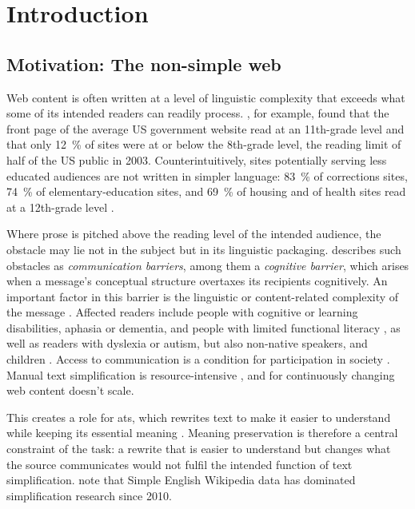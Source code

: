 \chapter{Introduction}
\label{sec:introduction}

\section{Motivation: The non-simple web}
\label{sec:motivation}

Web content is often written at a level of linguistic complexity that exceeds what some of its intended readers can readily process.
\textcite[4--5]{west2003state}, for example, found that the front page of the average US government website read at an 11th-grade level and that only \qty{12}{\percent} of sites were at or below the 8th-grade level, the reading limit of half of the US public in 2003.
Counterintuitively, sites potentially serving less educated audiences are not written in simpler language: \qty{83}{\percent} of corrections sites, \qty{74}{\percent} of elementary-education sites, and \qty{69}{\percent} of housing and of health sites read at a 12th-grade level \parencite[5]{west2003state}.

Where prose is pitched above the reading level of the intended audience, the obstacle may lie not in the subject but in its linguistic packaging.
\textcite[29, 31]{rink2018kommunikationsbarrieren} describes such obstacles as \emph{communication barriers}, among them a \emph{cognitive barrier}, which arises when a message's conceptual structure overtaxes its recipients cognitively.
An important factor in this barrier is the linguistic or content-related complexity of the message \parencite[18--19]{schubert2016barriereabbau}.
Affected readers include people with cognitive or learning disabilities, aphasia or dementia, and people with limited functional literacy \parencite[38]{rink2018kommunikationsbarrieren}, as well as readers with dyslexia or autism, but also non-native speakers, and children \parencite[135, 137]{alva-manchego-etal-2020-survey}.
Access to communication is a condition for participation in society \parencite[29]{rink2018kommunikationsbarrieren}.
Manual text simplification is resource-intensive \parencite[21]{stodden2026automatic}, and for continuously changing web content doesn't scale.

This creates a role for \gls{ats}, which rewrites text to make it easier to understand while keeping its essential meaning \parencites[259]{siddharthan-2014-survey}[135]{alva-manchego-etal-2020-survey}.
Meaning preservation is therefore a central constraint of the task: a rewrite that is easier to understand but changes what the source communicates would not fulfil the intended function of text simplification.
\textcite[402]{xu-etal-2016-optimizing} note that Simple English Wikipedia data has dominated simplification research since 2010.

